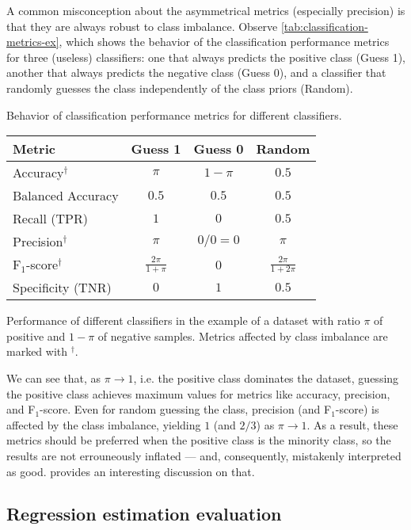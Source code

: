 A common misconception about the asymmetrical metrics (especially precision) is that they
are always robust to class imbalance.  Observe \cref{tab:classification-metrics-ex}, which shows
the behavior of the classification performance metrics for three (useless) classifiers: one
that always predicts the positive class (Guess 1), another that always predicts the
negative class (Guess 0), and a classifier that randomly guesses the class independently
of the class priors (Random).

\begin{tablebox}[label=tab:classification-metrics-ex]{Behavior of classification
  performance metrics for different classifiers.}
  \centering
  \begin{tabular}{l c c c}
    \toprule
    \textbf{Metric} & \textbf{Guess 1} & \textbf{Guess 0} & \textbf{Random} \\
    \midrule
    Accuracy$^\dagger$ & $\pi$ & $1 - \pi$ & $0.5$ \\
    Balanced Accuracy & $0.5$ & $0.5$ & $0.5$ \\
    Recall (TPR) & $1$ & $0$ & $0.5$ \\
    Precision$^\dagger$ & $\pi$ & $0/0 = 0$ & $\pi$ \\
    F$_1$-score$^\dagger$ & $\frac{2 \pi}{1 + \pi}$ & 0 & $\frac{2 \pi}{1 + 2\pi}$ \\
    Specificity (TNR) & $0$ & $1$ & $0.5$ \\
    \bottomrule
  \end{tabular}
  \tcblower
  Performance of different classifiers in the example of a dataset with ratio $\pi$ of
  positive and $1-\pi$ of negative samples.  Metrics affected by class imbalance are
  marked with $^\dagger$.
\end{tablebox}

We can see that, as $\pi \to 1$, i.e. the positive class dominates the dataset, guessing
the positive class achieves maximum values for metrics like accuracy, precision, and
F$_1$-score.  Even for random guessing the class, precision (and F$_1$-score) is affected
by the class imbalance, yielding $1$ (and $2/3$) as $\pi \to 1$.  As a result, these
metrics should be preferred when the positive class is the minority class, so the results
are not errouneously inflated --- and, consequently, mistakenly interpreted as good.
\citeauthor{Williams2021} provides an interesting discussion on
that.

\subsection{Regression estimation evaluation}

